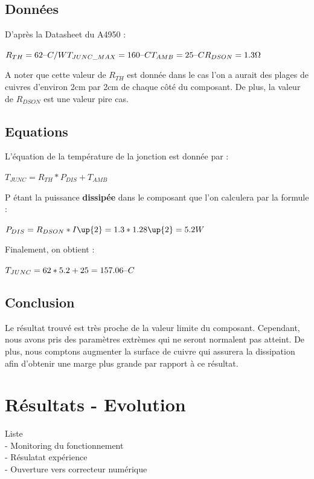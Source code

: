 \documentclass[11pt, french]{article} %
\begin{document}
\subsection{Données}

\noindent
D'après la Datasheet du A4950 :

\vspace{0.5cm}

\noindent
$ 
R_{TH} = 62 \char123C/W  \\
T_{JUNC\_MAX} = 160 \char123C  \\
T_{AMB} = 25\char123C  \\
R_{DSON} = 1.3 \Omega  \\
$



\noindent
A noter que cette valeur de $R_{TH}$ est donnée dans le cas l'on a aurait des plages de cuivres d'environ 2cm par 2cm de chaque côté du composant. De plus, la valeur de $R_{DSON}$ est une valeur pire cas.

\subsection{Equations}

\noindent
L'équation de la température de la jonction est donnée par :

\vspace{0.5cm}

\noindent
$
T_{JUNC} = R_{TH} * P_{DIS} + T_{AMB}
$

\vspace{0.5cm}

\noindent
P étant la puissance \textbf{dissipée} dans le composant que l'on calculera par la formule :

\vspace{0.5cm}

\noindent
$
P_{DIS} = R_{DSON} * I\up{2} = 1.3 * 1.28\up{2} = 5.2 W
$

\vspace{0.5cm}

\noindent
Finalement, on obtient :

\vspace{0.5cm}

\noindent
$
T_{JUNC} = 62 * 5.2 + 25 = 157.06 \char123C
$

\subsection{Conclusion}

\noindent
Le résultat trouvé est très proche de la valeur limite du composant. Cependant, nous avons pris des paramètres extrèmes qui ne seront normalent pas atteint. De plus, nous comptons augmenter la surface de cuivre qui assurera la dissipation afin d'obtenir une marge plus grande par rapport à ce résultat.

\section{Résultats - Evolution}
Liste
\\- Monitoring du fonctionnement
\\- Résulatat expérience
\\- Ouverture vers correcteur numérique
\end{document}
